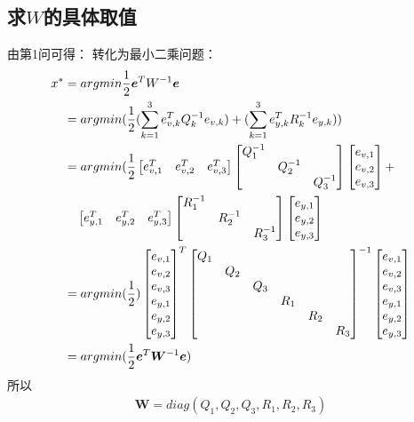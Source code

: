 \documentclass[40pt,a4paper，UTF8]{ctexart}
\numberwithin{equation}{section}
\begin{document}
\subsection{求$W$的具体取值}
由第1问可得：
转化为最小二乘问题：
\begin{align}
x^*
&=argmin\frac{1}{2}\bm{e}^TW^{-1}\bm{e} \notag \\
&=argmin(\frac{1}{2}(\sum\limits_{k=1}^{3}e_{v,k}^TQ_k^{-1}e_{v,k})+(\sum\limits_{k=1}^{3}e_{y,k}^TR_k^{-1}e_{y,k})) \notag \\
&=argmin(\frac{1}{2}
\begin{bmatrix}
e_{v,1}^T&e_{v,2}^T&e_{v,3}^T
\end{bmatrix}
\begin{bmatrix}
Q_1^{-1}& & \\
& Q_2^{-1}& \\
& & Q_3^{-1}
\end{bmatrix}
\begin{bmatrix}
e_{v,1}\\e_{v,2}\\e_{v,3}
\end{bmatrix}
+ \notag \\
& \quad 
\begin{bmatrix}
e_{y,1}^T&e_{y,2}^T&e_{y,3}^T
\end{bmatrix}
\begin{bmatrix}
R_1^{-1}& & \\
& R_2^{-1}& \\
& & R_3^{-1}
\end{bmatrix}
\begin{bmatrix}
e_{y,1}\\e_{y,2}\\e_{y,3}
\end{bmatrix} \notag \\
&=
argmin(\frac{1}{2})
\begin{bmatrix}
e_{v,1}\\e_{v,2}\\e_{v,3}\\e_{y,1}\\e_{y,2}\\e_{y,3}
\end{bmatrix}^T
\begin{bmatrix}
Q_1& &&&& \\
& Q_2&&&& \\
& & Q_3&&& \\
&&&R_1& & \\
&&&& R_2& \\
&&&& & R_3
\end{bmatrix}^{-1}
\begin{bmatrix}
e_{v,1}\\e_{v,2}\\e_{v,3}\\e_{y,1}\\e_{y,2}\\e_{y,3}
\end{bmatrix} \notag \\
&=argmin(\frac{1}{2}\bm{e}^T\bm W^{-1} \bm e
)
\end{align}
所以
\begin{align}
\bm W=diag(Q_1,Q_2,Q_3,R_1,R_2,R_3)
\end{align}
\end{document}
